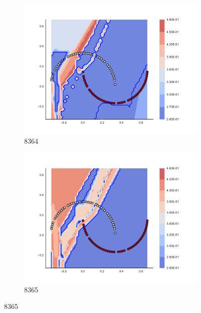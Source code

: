 \begin{figure}[h]
\begin{subfigure}[b]{0.09\textwidth}
    \includegraphics[clip, trim=2.35cm 1.75cm 4.5cm 0cm,width=\textwidth]{img/convergence/8364.pdf}
    \caption{8364}
    \label{fig:convergence_8364}
\end{subfigure}
%
\begin{subfigure}[b]{0.09\textwidth}
    \includegraphics[clip, trim=2.35cm 1.75cm 4.5cm 0cm,width=\textwidth]{img/convergence/8365.pdf}
    \caption{8365}
    \label{fig:convergence_8365}
\end{subfigure}
%
        \end{figure}
